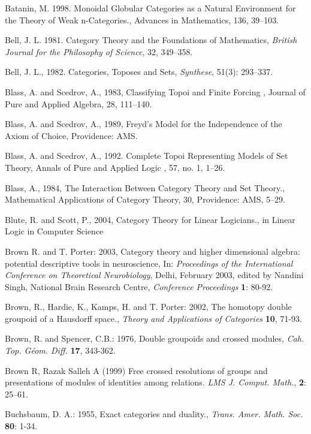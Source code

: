 \documentclass[12pt]{article}
\theoremstyle{plain}
\theoremstyle{definition}
\numberwithin{equation}{section}
\begin{document}
\begin{thebibliography}{99}
Batanin, M. 1998. Monoidal Globular Categories as a Natural Environment for the Theory of Weak n-Categories., Advances in Mathematics, 136, 39--103.   

Bell, J. L. 1981. Category Theory and the Foundations of Mathematics, \emph{British Journal for the Philosophy of Science}, 32, 349--358. 
 
Bell, J. L., 1982. Categories, Toposes and Sets, \emph{Synthese}, 51(3): 293--337. 
 
Blass, A. and Scedrov, A., 1983, Classifying Topoi and Finite Forcing , Journal of Pure and Applied Algebra, 28, 111--140. 

Blass, A. and Scedrov, A., 1989, Freyd's Model for the Independence of the Axiom of Choice, Providence: AMS.  

Blass, A. and Scedrov, A., 1992. Complete Topoi Representing Models of Set Theory, Annals of Pure and Applied Logic , 57, no. 1, 1--26.  

Blass, A., 1984, The Interaction Between Category Theory and Set Theory., Mathematical Applications of Category Theory, 30, Providence: AMS, 5--29. 

Blute, R. and Scott, P., 2004, Category Theory for Linear Logicians., in Linear Logic in Computer Science

Brown R. and T. Porter: 2003, Category theory and higher dimensional algebra: potential descriptive tools in neuroscience, In: {\em Proceedings of the International Conference on Theoretical Neurobiology}, Delhi, February 2003, edited by Nandini Singh, National Brain Research Centre, {\em Conference Proceedings} \textbf{1}: 80-92.

Brown, R., Hardie, K., Kamps, H. and T. Porter: 2002, The homotopy double groupoid of a Hausdorff space., 
\emph{Theory and Applications of Categories} \textbf{10}, 71-93.

Brown, R. and Spencer, C.B.: 1976, Double groupoids and crossed modules, \emph{Cah.  Top. G\'{e}om. Diff.} \textbf{17}, 343-362.

Brown R, Razak Salleh A (1999) Free crossed resolutions of groups and presentations of modules of
identities among relations. {\em LMS J. Comput. Math.}, \textbf{2}: 25--61.

Buchsbaum, D. A.: 1955, Exact categories and duality., {\em Trans. Amer. Math. Soc.} \textbf{80}: 1-34.


\end{thebibliography}
\end{document}
